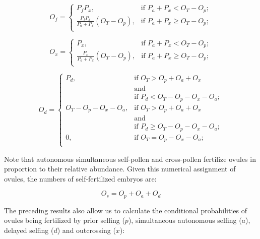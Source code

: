 \documentclass[letterpaper,titlepage]{scrartcl}
\begin{document}
\begin{equation}
        O_{f}=
        \begin{cases}
  P_{f}P_{x}, &\text{if }P_{a} + P_{x} < O_{T} - O_{p};\\
  \frac{P_{f}P_{x}}{P_{a} + P_{x}} \left( O_{T} - O_{p}\right), &\text{if }P_{a} + P_{x} \geqslant O_{T} - O_{p};\\
        \end{cases}
\end{equation}

\begin{equation}
  O_{x}=
  \begin{cases}
    P_{x}, &\text{if }P_{a} + P_{x} < O_{T} - O_{p};\\
    \frac{P_{x}}{P_{a} + P_{x}} \left( O_{T} - O_{p}\right), &\text{if }P_{a} + P_{x} \geqslant O_{T} - O_{p};\\
  \end{cases}
\end{equation}

\begin{equation}
  O_{d}=
  \begin{cases}
    P_{d}, &\text{if }O_{T} > O_{p} + O_{a} + O_{x}\\
    &\text{and}\\
    &\text{if }P_{d} < O_{T}-O_{p}-O_{x}-O_{a};\\
    O_{T}-O_{p}-O_{x}-O_{a}, &\text{if }O_{T} > O_{p} + O_{a} + O_{x}\\
    &\text{and}\\
    &\text{if }P_{d} \geqslant O_{T}-O_{p}-O_{x}-O_{a};\\
    0, &\text{if }O_{T}=O_{p}-O_{x}-O_{a};\\
  \end{cases}
\end{equation}

Note that autonomous simultaneous self-pollen and cross-pollen
fertilize ovules in proportion to their relative abundance. Given this
numerical assignment of ovules, the numbers of self-fertilized embryos
are:

\begin{equation}
  O_{s}=O_{p}+O_{a}+O_{d}
\end{equation}

The preceding results also allow us to calculate the conditional
probabilities of ovules being fertilized by prior selfing ($p$),
simultaneous autonomous selfing ($a$), delayed selfing ($d$) and
outcrossing ($x$):
\end{document}
